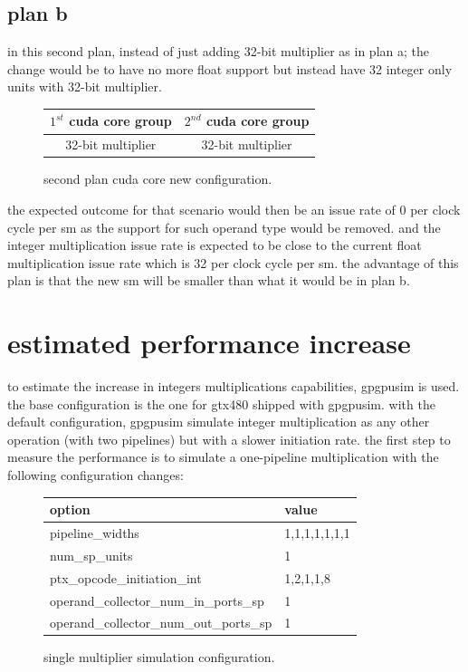 \documentclass{report}
\begin{document}
   \subsection{plan b}
   in this second plan, instead of just adding 32-bit multiplier as in plan a; the change would be to have no more float support but instead have 32 integer only units with 32-bit multiplier.
   \begin{figure}[h]
      \centering
       \begin{tabular}{ | c | c | }
    	    \hline
    	    $1^{st}$ cuda core group & $2^{nd}$ cuda core group \\ \hline
    	   32-bit multiplier & 32-bit multiplier \\ \hline
  	\end{tabular}
  	\captionsetup{justification=centering}
  	\caption{second plan cuda core new configuration.}
  	\label{fig:planb_cores}
   \end{figure}
   the expected outcome for that scenario would then be an issue rate of 0 per clock cycle per sm as the support for such operand type would be removed.
   and the integer multiplication issue rate is expected to be close to the current float multiplication issue rate which is 32 per clock cycle per sm.
   the advantage of this plan is that the new sm will be smaller than what it would be in plan b. 
   \section{estimated performance increase}
    to estimate the increase in integers multiplications capabilities, gpgpusim
    is used. the base configuration is the one for gtx480 shipped with gpgpusim.
    with the default configuration, gpgpusim simulate integer multiplication as
    any other operation (with two pipelines) but with a slower initiation rate.
    the first step to measure the performance is to simulate a one-pipeline
    multiplication with the following configuration changes:
    \begin{figure}[h]
    \centering
       \begin{tabular}{ | l | l | }
            \hline
    	    option & value \\ \hline
    	    pipeline\_widths & 1,1,1,1,1,1,1 \\
            num\_sp\_units & 1 \\
            ptx\_opcode\_initiation\_int & 1,2,1,1,8 \\
            operand\_collector\_num\_in\_ports\_sp & 1 \\
            operand\_collector\_num\_out\_ports\_sp & 1 \\ \hline

  	    \end{tabular}
  	\captionsetup{justification=centering}
  	\caption{single multiplier simulation configuration.}
  	\label{tab:1stconfig}
    \end{figure}
\end{document}
